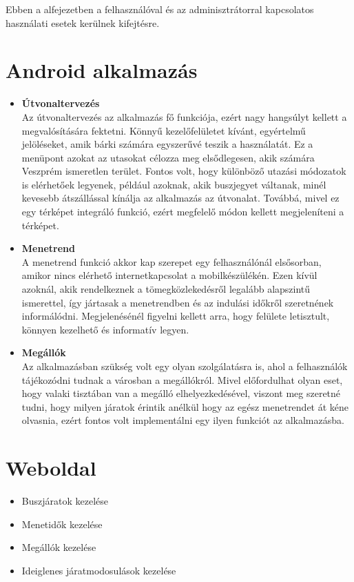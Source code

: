 Ebben a alfejezetben a felhasználóval és az adminisztrátorral kapcsolatos használati esetek kerülnek kifejtésre.

\section*{Android alkalmazás}
\begin{itemize}
	\item \textbf{Útvonaltervezés}
	\\
	Az útvonaltervezés az alkalmazás fő funkciója, ezért nagy hangsúlyt kellett a megvalósítására fektetni. 
	Könnyű kezelőfelületet kívánt, egyértelmű jelöléseket, amik bárki számára egyszerűvé teszik a használatát. 
	Ez a menüpont azokat az utasokat célozza meg elsődlegesen, akik számára Veszprém ismeretlen terület. 
	Fontos volt, hogy különböző utazási módozatok is elérhetőek legyenek, például azoknak, akik buszjegyet váltanak, minél kevesebb átszállással kínálja az alkalmazás az útvonalat. 
	Továbbá, mivel ez egy térképet integráló funkció, ezért megfelelő módon kellett megjeleníteni a térképet. 	
	\item \textbf{Menetrend}
	\\
	A menetrend funkció akkor kap szerepet egy felhasználónál elsősorban, amikor nincs elérhető internetkapcsolat a mobilkészülékén. 
	Ezen kívül azoknál, akik rendelkeznek a tömegközlekedésről legalább alapszintű ismerettel, így jártasak a menetrendben és az indulási időkről szeretnének informálódni. 
	Megjelenésénél figyelni kellett arra, hogy felülete letisztult, könnyen kezelhető és informatív legyen.
	\item \textbf{Megállók}
	\\
	Az alkalmazásban szükség volt egy olyan szolgálatásra is, ahol a felhasználók tájékozódni tudnak a városban a megállókról. 
	Mivel előfordulhat olyan eset, hogy valaki tisztában van a megálló elhelyezkedésével, viszont meg szeretné tudni, hogy milyen járatok érintik anélkül hogy az egész menetrendet át kéne olvasnia, ezért fontos volt implementálni egy ilyen funkciót az alkalmazásba. 
\end{itemize}
\section*{Weboldal}
\begin{itemize}
	\item Buszjáratok kezelése
	\item Menetidők kezelése
	\item Megállók kezelése
	\item Ideiglenes járatmodosulások kezelése
\end{itemize}
	
